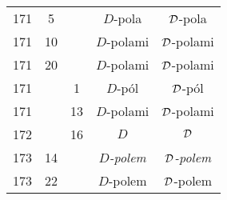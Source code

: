 \documentclass[a4paper,11pt]{article}
\begin{document}
\begin{center}
\begin{tabular}{|c|c|c|c|c|}
    171 & \hphantom{0}5 & & $D$-pola & $\mathcal{D}$-pola \\
    171 & 10 & & $D$-polami & $\mathcal{D}$-polami \\
    171 & 20 & & $D$-polami & $\mathcal{D}$-polami \\
    171 & & \hphantom{0}1 & $D$-pól & $\mathcal{D}$-pól \\
    171 & & 13 & $D$-polami & $\mathcal{D}$-polami \\
    172 & & 16 & $D$ & $\mathcal{D}$ \\
    173 & 14 & & \textit{$D$-polem} & \textit{$\mathcal{D}$-polem} \\
    173 & 22 & & $D$-polem & $\mathcal{D}$-polem \\
    \hline
  \end{tabular}






\end{center}
\end{document}
